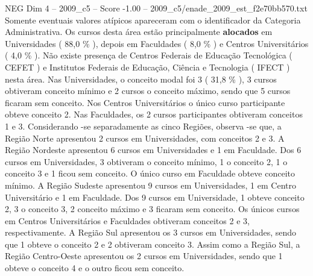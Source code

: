 \begin{textsample}{NEG Dim 4 – 2009\_c5 – Score -1.00 – 2009\_c5/enade\_2009\_est\_f2e70bb570.txt}
Somente eventuais valores atípicos apareceram com o identificador da Categoria Administrativa.
Os cursos desta área estão principalmente \textbf{alocados} em Universidades ( 88,0 \% ), depois em Faculdades ( 8,0 \% ) e Centros Universitários ( 4,0 \% ).
Não existe presença de Centros Federais de Educação Tecnológica ( CEFET ) e Institutos Federais de Educação, Ciência e Tecnologia ( IFECT ) nesta área.
Nas Universidades, o conceito modal foi 3 ( 31,8 \% ), 3 cursos obtiveram conceito mínimo e 2 cursos o conceito máximo, sendo que 5 cursos ficaram sem conceito.
Nos Centros Universitários o único curso participante obteve conceito 2.
Nas Faculdades, os 2 cursos participantes obtiveram conceitos 1 e 3.
Considerando -se separadamente as cinco Regiões, observa -se que, a Região Norte apresentou 2 cursos em Universidades, com conceitos 2 e 3.
A Região Nordeste apresentou 6 cursos em Universidades e 1 em Faculdade.
Dos 6 cursos em Universidades, 3 obtiveram o conceito mínimo, 1 o conceito 2, 1 o conceito 3 e 1 ficou sem conceito.
O único curso em Faculdade obteve conceito mínimo.
A Região Sudeste apresentou 9 cursos em Universidades, 1 em Centro Universitário e 1 em Faculdade.
Dos 9 cursos em Universidade, 1 obteve conceito 2, 3 o conceito 3, 2 conceito máximo e 3 ficaram sem conceito.
Os únicos cursos em Centros Universitários e Faculdades obtiveram conceitos 2 e 3, respectivamente.
A Região Sul apresentou os 3 cursos em Universidades, sendo que 1 obteve o conceito 2 e 2 obtiveram conceito 3.
Assim como a Região Sul, a Região Centro-Oeste apresentou os 2 cursos em Universidades, sendo que 1 obteve o conceito 4 e o outro ficou sem conceito.

\end{textsample}
